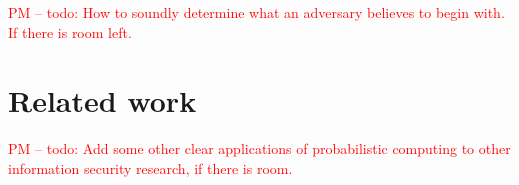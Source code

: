 \documentclass{article} %
\newcommand{\pxm}[1]{\textcolor{red}{PM -- #1}}
\theoremstyle{plain} %
\theoremstyle{definition} %
\begin{document}
\pxm{todo: How to soundly determine what an adversary believes to begin
  with. If there is room left.}

\section*{Related work} \pxm{todo: Add some other clear applications
  of probabilistic computing to other information security research,
  if there is room.}





\end{document}
